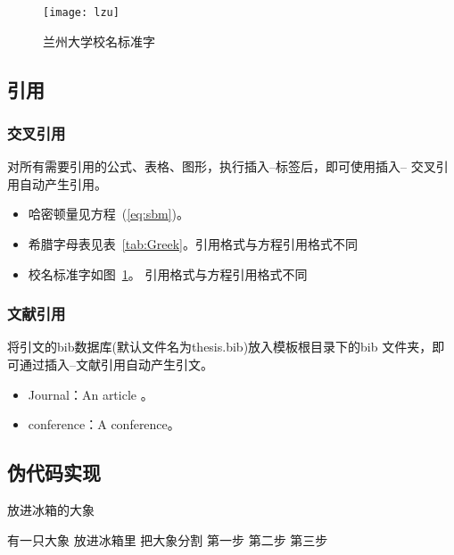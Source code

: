 \documentclass{LZUthesis}
\begin{document}
\begin{figure}[H]
\begin{centering}
\texttt{[image: lzu]}\\
\end{centering}
\protect\caption{兰州大学校名标准字\label{fig:lzu}}
\end{figure}

\subsection{引用}
\subsubsection{交叉引用}

对所有需要引用的公式、表格、图形，执行插入--标签后，即可使用插入-- 交叉引用自动产生引用。
\begin{itemize}
\item 哈密顿量见方程~(\ref{eq:sbm})。
\item 希腊字母表见表~\ref{tab:Greek}。引用格式与方程引用格式不同
\item 校名标准字如图~\ref{fig:lzu}。 引用格式与方程引用格式不同
\end{itemize}


\subsubsection{文献引用}

将引文的bib数据库(默认文件名为thesis.bib)放入模板根目录下的bib 文件夹，即可通过插入--文献引用自动产生引文。
\begin{itemize}
\item Journal：An article \cite{partl2016}。
\item conference：A conference\cite{tussyadiah2015hotels}。
\end{itemize}

\subsection{伪代码实现}

\begin{algorithm}
  \caption{放进冰箱的大象}
  \label{算法实例}
  \begin{algorithmic}
  \REQUIRE 有一只大象
  \ENSURE 放进冰箱里
     \STATE 把大象分割
        \ENDIF
    \ENDFOR
   \STATE 第一步
  \STATE 第二步
  \STATE 第三步
  \end{algorithmic}
\end{algorithm}
\end{document}
